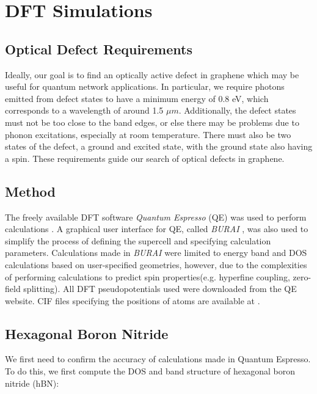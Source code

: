 \documentclass[]{article}
\begin{document}
\section{DFT Simulations}\label{sec: DFT_simulations}
\subsection{Optical Defect Requirements}\label{sec: Optical_Defect_Requirements}
Ideally, our goal is to find an optically active defect in graphene which may be useful for quantum network applications. In particular, we require photons emitted from defect states to have a minimum energy of 0.8 eV, which corresponds to a wavelength of around 1.5 $\mu m$. Additionally, the defect states must not be too close to the band edges, or else there may be problems due to phonon excitations, especially at room temperature. There must also be two states of the defect, a ground and excited state, with the ground state also having a spin. These requirements guide our search of optical defects in graphene. 

\subsection{Method}
The freely available DFT software \textit{Quantum Espresso} (QE) was used to perform calculations \cite{quantum_espresso}. A graphical user interface for QE, called \textit{BURAI} \cite{Burai}, was also used to simplify the process of defining the supercell and specifying calculation parameters. Calculations made in \textit{BURAI} were limited to energy band and DOS calculations based on user-specified geometries, however, due to the complexities of performing calculations to predict spin properties\footnotemark (e.g. hyperfine coupling, zero-field splitting). All DFT pseudopotentials used were downloaded from the QE website. CIF files specifying the positions of atoms are available at \cite{QE_Google_Drive}.


\subsection{Hexagonal Boron Nitride}
We first need to confirm the accuracy of calculations made in Quantum Espresso. To do this, we first compute the DOS and band structure of hexagonal boron nitride (hBN):
\end{document}
